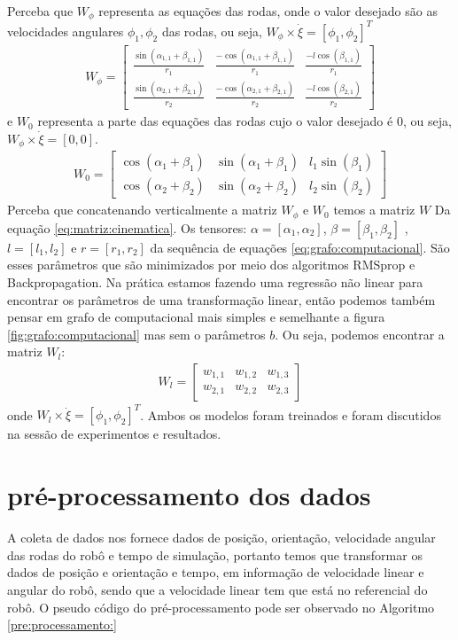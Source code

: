 Perceba que $W_{\phi}$ representa as equações das rodas, onde
o valor desejado são as velocidades angulares $\phi_1,\phi_2$ das rodas,
ou seja, $W_{\phi} \times \dot{\xi} = [\phi_{1},\phi_2]^{T} $
\begin{align}
    W_{\phi} = 
    \begin{bmatrix}
        \frac{\sin(\alpha_{1,1} + \beta_{1,1})}{r_1} &  \frac{-\cos(\alpha_{1,1} + \beta_{1,1})}{r_1} & \frac{-l\cos(\beta_{1,1})}{r_1} \\
        \frac{\sin(\alpha_{2,1} + \beta_{2,1})}{r_2} &  \frac{-\cos(\alpha_{2,1} + \beta_{2,1})}{r_2} & \frac{-l\cos(\beta_{2,1})}{r_2}
    \end{bmatrix}
\end{align}
e $W_0$ representa a parte das equações das rodas cujo o valor desejado
é 0, ou seja, $W_{\phi} \times \dot{\xi} = [0,0]$.
\begin{align}
    W_{0} = 
    \begin{bmatrix}
        \cos(\alpha_{1} + \beta_{1}) &  \sin(\alpha_{1} + \beta_{1}) &  l_1\sin(\beta_{1}) \\
        \cos(\alpha_{2} + \beta_{2}) &  \sin(\alpha_{2} + \beta_{2})  &  l_2\sin(\beta_{2})
    \end{bmatrix}
\end{align}
Perceba que concatenando verticalmente a matriz $W_{\phi}$ e $ W_{0}$ temos a matriz $W$
Da equação \ref{eq:matriz:cinematica}. 
Os tensores: $\alpha =[\alpha_1,\alpha_2]$,
$\beta=[\beta_1,\beta_2]$ , $l=[l_1,l_2]$ e $r=[r_1,r_2]$
da sequência de equações \ref{eq:grafo:computacional}.
São esses parâmetros que são minimizados por meio dos algoritmos RMSprop
e Backpropagation. Na prática
estamos fazendo uma regressão não linear
para encontrar os parâmetros de uma transformação linear, então podemos também
pensar em grafo de computacional mais simples e semelhante a
figura \ref{fig:grafo:computacional} mas sem o parâmetros $b$.
Ou seja, podemos encontrar a matriz $W_l$:
\begin{align}
    W_l = 
    \begin{bmatrix}
        w_{1,1} &  w_{1,2} &  w_{1,3} \\
        w_{2,1} &  w_{2,2} &  w_{2,3}
    \end{bmatrix}
\end{align}
onde $W_l \times \dot{\xi} = [\phi_{1},\phi_2]^{T}$.
Ambos os modelos foram treinados e foram discutidos na
sessão de experimentos e resultados.


\section{pré-processamento dos dados}
A coleta de dados nos fornece dados de posição, orientação, velocidade angular
das rodas do robô e tempo de simulação, portanto temos que transformar os dados
de posição e orientação e tempo, em informação de velocidade linear e angular
do robô, sendo que a velocidade linear tem que está no referencial do robô.
O pseudo código do pré-processamento pode ser observado no Algoritmo \ref{pre:processamento:}

